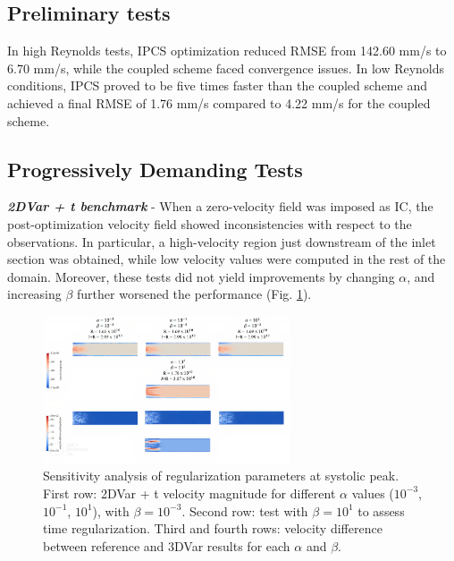 \subsection*{Preliminary tests}
In high Reynolds tests, IPCS optimization reduced RMSE from 142.60 mm/s to 6.70 mm/s, while the coupled scheme faced convergence issues. In low Reynolds conditions, IPCS proved to be five times faster than the coupled scheme and achieved a final RMSE of 1.76 mm/s compared to 4.22 mm/s for the coupled scheme.

\subsection*{Progressively Demanding Tests}
\textbf{\textit{2DVar + t benchmark}} - When a zero-velocity field was imposed as IC, the post-optimization velocity field showed inconsistencies with respect to the observations.
In particular, a high-velocity region just downstream of the inlet section was obtained, while low velocity values were computed in the rest of the domain.
Moreover, these tests did not yield improvements by changing \(\alpha\), and increasing \(\beta\) further worsened the performance (Fig. \ref{fig:3.3}). 

\begin{figure}
    \centering
    \includegraphics[width=0.65\textwidth, height = 0.25\textheight]{chapters/chp1/graphics/01.07_pt2.JPG}
    \caption{Sensitivity analysis of regularization parameters at systolic peak. First row: 2DVar + t velocity magnitude for different $\alpha$ values ($10^{-3}$, $10^{-1}$, $10^{1}$), with $\beta = 10^{-3}$. Second row: test with $\beta = 10^{1}$ to assess time regularization. Third and fourth rows: velocity difference between reference and 3DVar results for each $\alpha$ and $\beta$.}
    \label{fig:3.3}
\end{figure}

